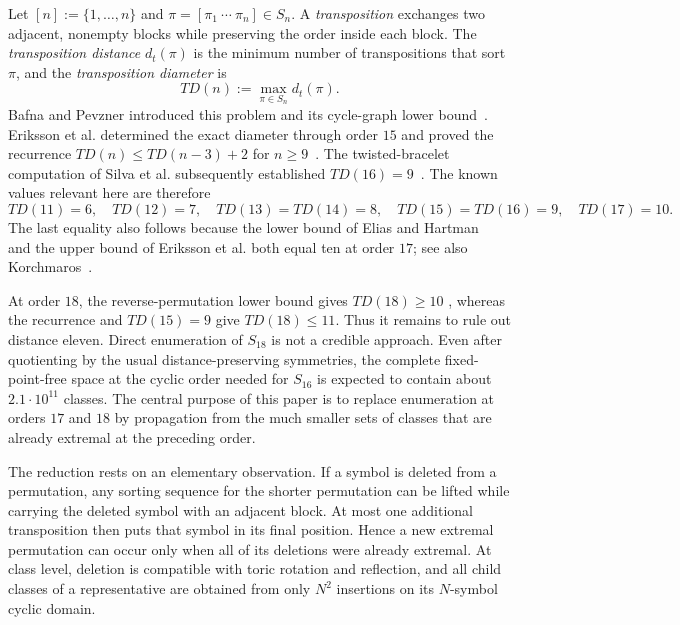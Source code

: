 \documentclass[11pt]{article}
\theoremstyle{definition}
\theoremstyle{remark}
\newcommand{\dist}{d_t}
\begin{document}
Let $[n]:=\{1,\ldots,n\}$ and
$\pi=[\pi_1\ \cdots\ \pi_n]\in S_n$.  A \emph{transposition}
exchanges two adjacent, nonempty blocks while preserving the order inside
each block.  The \emph{transposition distance} $\dist(\pi)$ is the minimum
number of transpositions that sort $\pi$, and the \emph{transposition
diameter} is
\[
  TD(n):=\max_{\pi\in S_n}\dist(\pi).
\]
Bafna and Pevzner introduced this problem and its cycle-graph lower
bound~\cite{BafnaPevzner1998}.  Eriksson et al. determined the exact diameter
through order $15$ and proved the recurrence
$TD(n)\leq TD(n-3)+2$ for $n\geq9$~\cite{ErikssonEtAl2001}.
The twisted-bracelet computation of Silva et al. subsequently established
$TD(16)=9$~\cite{SilvaEtAl2026}.  The known values relevant here are therefore
\[
  TD(11)=6,\quad TD(12)=7,\quad TD(13)=TD(14)=8,
  \quad TD(15)=TD(16)=9,\quad TD(17)=10.
\]
The last equality also follows because the lower bound of Elias and
Hartman~\cite{EliasHartman2006} and the upper bound of Eriksson et al. both
equal ten at order $17$; see also Korchmaros~\cite{Korchmaros2015}.

At order $18$, the reverse-permutation lower bound gives $TD(18)\geq10$
\cite{MeidanisWalterDias1997}, whereas the recurrence and $TD(15)=9$ give
$TD(18)\leq11$.  Thus it remains to rule out distance eleven.  Direct
enumeration of $S_{18}$ is not a credible approach.  Even after quotienting
by the usual distance-preserving symmetries, the complete fixed-point-free
space at the cyclic order needed for $S_{16}$ is expected to contain about
$2.1\cdot10^{11}$ classes.  The central purpose of this paper is to replace
enumeration at orders $17$ and $18$ by propagation from the much smaller
sets of classes that are already extremal at the preceding order.

The reduction rests on an elementary observation.  If a symbol is deleted
from a permutation, any sorting sequence for the shorter permutation can be
lifted while carrying the deleted symbol with an adjacent block.  At most one
additional transposition then puts that symbol in its final position.  Hence a
new extremal permutation can occur only when all of its deletions were already
extremal.  At class level, deletion is compatible with toric rotation and
reflection, and all child classes of a representative are obtained from only
$N^2$ insertions on its $N$-symbol cyclic domain.
\end{document}
